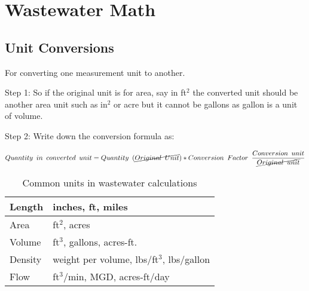 \chapter{Wastewater Math}


\section{Unit Conversions}
For converting one measurement unit to another.

Step 1:    So if the original unit is for area, say in ft$^2$ the converted unit should be another area unit such as in$^2$ or acre but it cannot be gallons as gallon is a unit of volume.

Step 2: Write down the conversion formula as:

$Quantity \enspace in \enspace converted \enspace unit = Quantity \enspace (\cancel{Original \enspace Unit}) *   Conversion  \enspace Factor \enspace  \dfrac{Conversion \enspace unit}{\cancel{Original \enspace unit}}$


\begin{table}[h!]

\begin{center}
    \begin{tabular}{ | p{4cm} |p{8cm}|}
    \hline
    
    
Length  & inches, ft, miles\\
\hline 
Area  & ft$^2$, acres \\
\hline 
Volume & ft$^3$, gallons, acres-ft.\\
\hline 
Density & weight per volume, lbs/ft$^3$, lbs/gallon\\
\hline 
Flow & ft$^3$/min, MGD, acres-ft/day\\
\hline 

	

    \end{tabular}
 \caption{Common units in wastewater calculations}	
    \end{center}

    \end{table}




